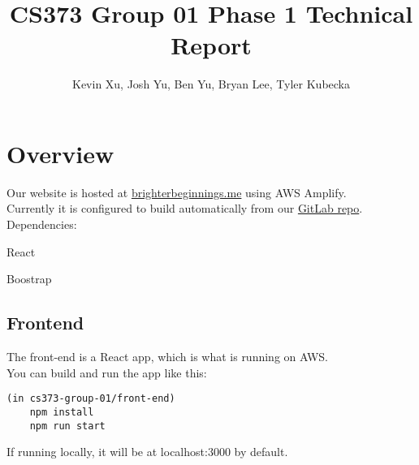 \documentclass[12pt]{article}
\title{CS373 Group 01 Phase 1 Technical Report}
\author{Kevin Xu, Josh Yu, Ben Yu, Bryan Lee, Tyler Kubecka}
\begin{document}
\maketitle

\section{Overview}

Our website is hosted at \href{https://brighterbeginnings.me}{brighterbeginnings.me} using AWS Amplify.
\\
Currently it is configured to build automatically from our \href{https://gitlab.com/kxut/cs373-group-01/}{GitLab repo}.
\\
Dependencies:

React

Boostrap
\subsection{Frontend}
The front-end is a React app, which is what is running on AWS.
\\ You can build and run the app like this:
\begin{verbatim}
(in cs373-group-01/front-end)
    npm install
    npm run start
\end{verbatim}
If running locally, it will be at localhost:3000 by default.
\end{document}
